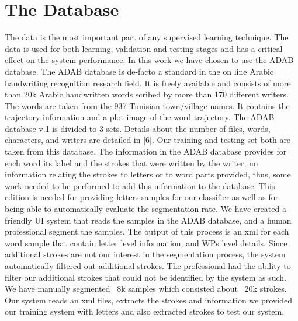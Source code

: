 \documentclass[journal,compsoc]{IEEEtran}
\begin{document}
\section{The Database}
The data is the most important part of any supervised learning technique. The data is used for both learning, validation and testing stages and has a critical effect on the system performance. In this work we have chosen to use the ADAB database. The ADAB database is de-facto a standard in the on line Arabic handwriting recognition research field. It is freely available and consists of more than 20k Arabic handwritten words scribed by more than 170 different writers. The words are taken from the 937 Tunisian town/village names. It contains the trajectory information and a plot image of the word trajectory. The ADAB-database v.1 is divided to 3 sets. Details about the number of files, words, characters, and writers are detailed in [6]. Our training and testing set both are taken from this database. 
The information in the ADAB database provides for each word its label and the strokes that were written by the writer, no information relating the strokes to letters or to word parts provided, thus, some work needed to be performed to add this information to the database. This edition is needed for providing letters samples for our classifier as well as for being able to automatically evaluate the segmentation rate. We have created a friendly UI system that reads the samples in the ADAB database, and a human professional segment the samples. The output of this process is an xml for each word sample that contain letter level information, and WPs level details. Since additional strokes are not our interest in the segmentation process, the system automatically filtered out additional strokes. The professional had the ability to filter our additional strokes that could not be identified by the system as such. We have manually segmented ~8k samples which consisted about ~20k strokes.
Our system reads an xml files, extracts the strokes and information we provided our training system with letters and also extracted strokes to test our system. 
\end{document}
